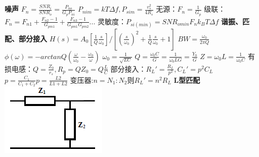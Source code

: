 \documentclass[10.5pt,landscape]{article}
\begin{document}
\raggedright
\footnotesize
\begin{multicols*}{4}


\setlength{\premulticols}{1pt}
\setlength{\postmulticols}{1pt}
\setlength{\multicolsep}{1pt}
\setlength{\columnsep}{2pt}

\textbf{ 噪声} \newline
\scriptsize
$F_n = \frac{SNR_i}{SNR_o}=\frac{P_{no}}{G_p P_{ni}}$\newline
$P_{nim}=kT\Delta f, P_{sim}=\frac{v_s^2}{4R_s}$\newline
无源：$F_n = \frac{1}{G_p}$\newline
级联：$F_n  = F_{n1} + \frac{F_{n2} - 1}{G_{pm1}} + \frac{F_{n3} - 1}{G_{pm1}G_{pm2}} ... $\newline
灵敏度：$P_{si(min)} = SNR_{o min}F_n k_B T \Delta f$ \newline
\textbf{谐振、匹配、部分接入}\newline
$H(s) = A_0[ \frac{1}{Q}\frac{s}{\omega_0}] / [(\frac{s}{\omega_0})^2 + \frac{1}{Q}\frac{s}{\omega_0} + 1]$\newline
$BW = \frac{\omega_0}{2\pi Q} $\newline
$ \phi(\omega) = -arctan Q(\frac{\omega}{\omega_0} - \frac{\omega_0}{\omega}) $\newline
$ \omega_0 = \frac{1}{\sqrt{LC}} $\newline
$ Q = \frac{\omega_0 C}{G} = \frac{1}{\omega_0LG}  = \frac{Y_0}{G} $\newline
$ Z = \omega_0 L = \frac{1}{\omega_0 C} $\newline
有损电感：$ Q = \frac{Z_0}{r_s}, R_p = Q Z_0 = Q \frac{L}{C}$\newline
部分接入：$ R_L' = \frac{R_L}{p^2}, C_L' = p^2 C_L $\newline
$ p = \frac{C_1}{C_1 + C_2}  p = \frac{L2}{L1 + L2} $\newline
变压器:$n = N_1:N_2$则$R_L' = n^2R_L$ \newline
\textbf{L型匹配}\newline
\includegraphics[scale=0.5]{L}\newline

\end{multicols*}
\end{document}
